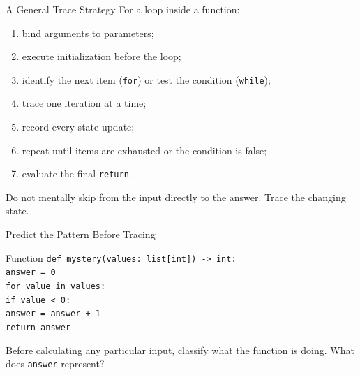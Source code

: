 \documentclass[aspectratio=169,10pt]{beamer}
\begin{document}
\begin{frame}{A General Trace Strategy}
  For a loop inside a function:

  \begin{enumerate}
    \item bind arguments to parameters;
    \item execute initialization before the loop;
    \item identify the next item (\texttt{for}) or test the condition (\texttt{while});
    \item trace one iteration at a time;
    \item record every state update;
    \item repeat until items are exhausted or the condition is false;
    \item evaluate the final \texttt{return}.
  \end{enumerate}

  \begin{keyidea}
    Do not mentally skip from the input directly to the answer. Trace the changing state.
  \end{keyidea}
\end{frame}

\begin{frame}{Predict the Pattern Before Tracing}
  \begin{block}{Function}
    \texttt{def mystery(values: list[int]) -> int:}\\
    \hspace{0.20in}\texttt{answer = 0}\\
    \hspace{0.20in}\texttt{for value in values:}\\
    \hspace{0.40in}\texttt{if value < 0:}\\
    \hspace{0.60in}\texttt{answer = answer + 1}\\
    \hspace{0.20in}\texttt{return answer}
  \end{block}

  \begin{activity}
    Before calculating any particular input, classify what the function is doing. What does \texttt{answer} represent?
  \end{activity}
\end{frame}
\end{document}
